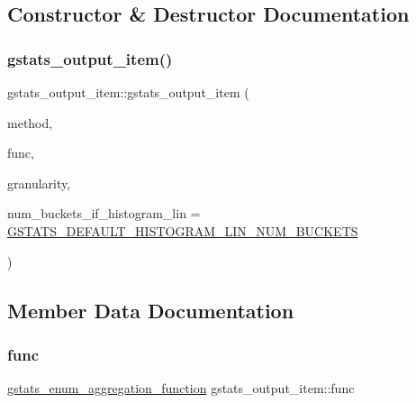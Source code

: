 \subsection{Constructor \& Destructor Documentation}
\mbox{\label{classgstats__output__item_aba1918b48bf95a14c7763e51566b6f38}} 
\subsubsection{\texorpdfstring{gstats\+\_\+output\+\_\+item()}{gstats\_output\_item()}}
{\footnotesize\ttfamily gstats\+\_\+output\+\_\+item\+::gstats\+\_\+output\+\_\+item (\begin{DoxyParamCaption}\item[{\hyperlink{gstats_8h_a69c3463fdd73c04b651dbfcc1425650f}{gstats\+\_\+enum\+\_\+output\+\_\+method}}]{method,  }\item[{\hyperlink{gstats_8h_aa5e4744ebbda83fd3ef2ae3226461ac3}{gstats\+\_\+enum\+\_\+aggregation\+\_\+function}}]{func,  }\item[{\hyperlink{gstats_8h_a625875e2a7c8582f278735673cfb398c}{gstats\+\_\+enum\+\_\+aggregation\+\_\+granularity}}]{granularity,  }\item[{const int}]{num\+\_\+buckets\+\_\+if\+\_\+histogram\+\_\+lin = {\ttfamily \hyperlink{gstats_8h_a1825fbb4f3d626ca97db468c8614e797}{G\+S\+T\+A\+T\+S\+\_\+\+D\+E\+F\+A\+U\+L\+T\+\_\+\+H\+I\+S\+T\+O\+G\+R\+A\+M\+\_\+\+L\+I\+N\+\_\+\+N\+U\+M\+\_\+\+B\+U\+C\+K\+E\+TS}} }\end{DoxyParamCaption})\hspace{0.3cm}{\ttfamily [inline]}}



\subsection{Member Data Documentation}
\mbox{\label{classgstats__output__item_ad6e18ed2e1f2548806f9e7aeec9d6163}} 
\subsubsection{\texorpdfstring{func}{func}}
{\footnotesize\ttfamily \hyperlink{gstats_8h_aa5e4744ebbda83fd3ef2ae3226461ac3}{gstats\+\_\+enum\+\_\+aggregation\+\_\+function} gstats\+\_\+output\+\_\+item\+::func}

